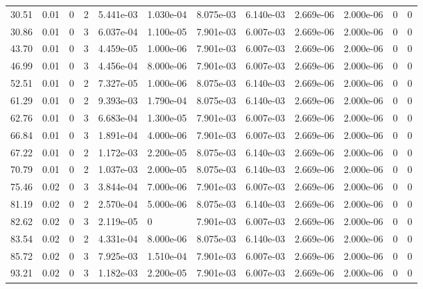 \documentclass[preview]{standalone}
\begin{document}
{{\begin{tabular}{L{1.2cm}C{1.2cm} C{0.3cm}C{0.5cm} C{1.4cm}C{1.4cm} C{1.4cm}C{1.4cm} C{1.6cm}C{1.6cm} C{1.6cm}C{1.6cm}}
  30.51  &  0.01  & 0     &  2 &  5.441e-03  & 1.030e-04  &  8.075e-03&   6.140e-03& 2.669e-06 & 2.000e-06   &  0 & 0  \\ 
  30.86  &  0.01  & 0     &  3 &  6.037e-04  & 1.100e-05  &  7.901e-03&   6.007e-03& 2.669e-06 & 2.000e-06   &  0 & 0  \\ 
  43.70  &  0.01  & 0     &  3 &  4.459e-05  & 1.000e-06  &  7.901e-03&   6.007e-03& 2.669e-06 & 2.000e-06   &  0 & 0  \\ 
  46.99  &  0.01  & 0     &  3 &  4.456e-04  & 8.000e-06  &  7.901e-03&   6.007e-03& 2.669e-06 & 2.000e-06   &  0 & 0  \\ 
  52.51  &  0.01  & 0     &  2 &  7.327e-05  & 1.000e-06  &  8.075e-03&   6.140e-03& 2.669e-06 & 2.000e-06   &  0 & 0  \\ 
  61.29  &  0.01  & 0     &  2 &  9.393e-03  & 1.790e-04  &  8.075e-03&   6.140e-03& 2.669e-06 & 2.000e-06   &  0 & 0  \\ 
  62.76  &  0.01  & 0     &  3 &  6.683e-04  & 1.300e-05  &  7.901e-03&   6.007e-03& 2.669e-06 & 2.000e-06   &  0 & 0  \\ 
  66.84  &  0.01  & 0     &  3 &  1.891e-04  & 4.000e-06  &  7.901e-03&   6.007e-03& 2.669e-06 & 2.000e-06   &  0 & 0  \\ 
  67.22  &  0.01  & 0     &  2 &  1.172e-03  & 2.200e-05  &  8.075e-03&   6.140e-03& 2.669e-06 & 2.000e-06   &  0 & 0  \\ 
  70.79  &  0.01  & 0     &  2 &  1.037e-03  & 2.000e-05  &  8.075e-03&   6.140e-03& 2.669e-06 & 2.000e-06   &  0 & 0  \\ 
  75.46  &  0.02  & 0     &  3 &  3.844e-04  & 7.000e-06  &  7.901e-03&   6.007e-03& 2.669e-06 & 2.000e-06   &  0 & 0  \\ 
  81.19  &  0.02  & 0     &  2 &  2.570e-04  & 5.000e-06  &  8.075e-03&   6.140e-03& 2.669e-06 & 2.000e-06   &  0 & 0  \\ 
  82.62  &  0.02  & 0     &  3 &  2.119e-05  & 0  &  7.901e-03&   6.007e-03& 2.669e-06 & 2.000e-06   &  0 & 0  \\ 
  83.54  &  0.02  & 0     &  2 &  4.331e-04  & 8.000e-06  &  8.075e-03&   6.140e-03& 2.669e-06 & 2.000e-06   &  0 & 0  \\ 
  85.72  &  0.02  & 0     &  3 &  7.925e-03  & 1.510e-04  &  7.901e-03&   6.007e-03& 2.669e-06 & 2.000e-06   &  0 & 0  \\ 
  93.21  &  0.02  & 0     &  3 &  1.182e-03  & 2.200e-05  &  7.901e-03&   6.007e-03& 2.669e-06 & 2.000e-06   &  0 & 0  \\ 
\hline 
\end{tabular} 

}}
\end{document}
